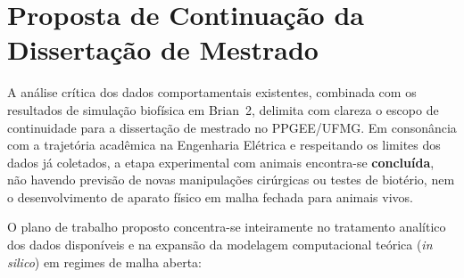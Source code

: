\documentclass[11pt,a4paper,article,brazil]{abntex2}
\begin{document}
\section{Proposta de Continuação da Dissertação de Mestrado}

A análise crítica dos dados comportamentais existentes, combinada com os resultados de simulação biofísica em \textsf{Brian~2}, delimita com clareza o escopo de continuidade para a dissertação de mestrado no PPGEE/UFMG. Em consonância com a trajetória acadêmica na Engenharia Elétrica e respeitando os limites dos dados já coletados, a etapa experimental com animais encontra-se \textbf{concluída}, não havendo previsão de novas manipulações cirúrgicas ou testes de biotério, nem o desenvolvimento de aparato físico em malha fechada para animais vivos.

O plano de trabalho proposto concentra-se inteiramente no tratamento analítico dos dados disponíveis e na expansão da modelagem computacional teórica (\emph{in silico}) em regimes de malha aberta:
\end{document}
